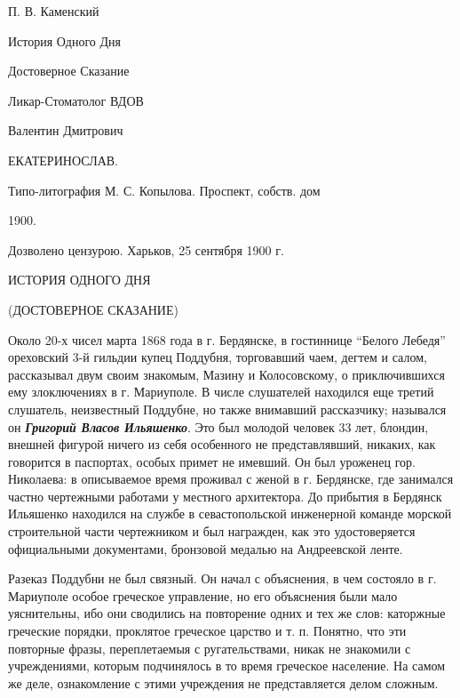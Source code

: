 

П. В. Каменский

История Одного Дня

Достоверное Сказание

Ликар-Стоматолог ВДОВ

Валентин Дмитрович

ЕКАТЕРИНОСЛАВ.

Типо-литография М. С. Копылова. Проспект, собств. дом

1900.


Дозволено цензурою. Харьков, 25 сентября 1900 г.


ИСТОРИЯ ОДНОГО ДНЯ

(ДОСТОВЕРНОЕ СКАЗАНИЕ)

Около 20-х чисел марта 1868 года в г. Бердянске,
в гостиннице ``Белого Лебедя'' ореховский 3-й гильдии купец Поддубня,
торговавший чаем, дегтем и салом, рассказывал двум своим знакомым, Мазину и Колосовскому,
о приключившихся ему злоключениях в г. Мариуполе. В числе слушателей
находился еще третий слушатель, неизвестный Поддубне, но также внимавший рассказчику;
назывался он \textbf{\em Григорий Власов Ильяшенко}. Это был молодой человек 33 лет, блондин, внешней 
фигурой ничего из себя особенного не представлявший, никаких, как говорится в паспортах, особых примет не имевший.
Он был уроженец гор. Николаева: в описываемое время проживал с женой в г. Бердянске, где занимался частно
чертежными работами у местного архитектора. До прибытия в Бердянск Ильяшенко
находился на службе в севастопольской инженерной команде морской строительной части
чертежником и был награжден, как это удостоверяется
официальными документами, бронзовой медалью на Андреевской ленте.

Разеказ Поддубни не был связный. Он начал с объяснения, в чем состояло в г. Мариуполе
особое греческое управление, но его объяснения были мало уяснительны,
ибо они сводились на повторение одних и тех же слов: каторжные греческие порядки,
проклятое греческое царство и т. п. Понятно, что эти повторные фразы,
переплетаемыя с ругательствами, никак не знакомили 
с учреждениями, которым подчинялось в то время греческое население.
На самом же деле, ознакомление с этими учреждения не представляется делом сложным.

